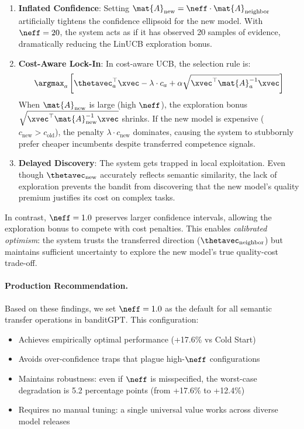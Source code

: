 \begin{enumerate}[leftmargin=*, itemsep=2pt]
    \item \textbf{Inflated Confidence}: Setting $\mat{A}_{\text{new}} = \neff \cdot \mat{A}_{\text{neighbor}}$ artificially tightens the confidence ellipsoid for the new model. With $\neff=20$, the system acts as if it has observed 20 samples of evidence, dramatically reducing the LinUCB exploration bonus.
    
    \item \textbf{Cost-Aware Lock-In}: In cost-aware UCB, the selection rule is:
    \[
    \argmax_{a} \left[ \thetavec_a^\top \xvec - \lambda \cdot c_a + \alpha \sqrt{\xvec^\top \mat{A}_a^{-1} \xvec} \right]
    \]
    When $\mat{A}_{\text{new}}$ is large (high $\neff$), the exploration bonus $\sqrt{\xvec^\top \mat{A}_{\text{new}}^{-1} \xvec}$ shrinks. If the new model is expensive ($c_{\text{new}} > c_{\text{old}}$), the penalty $\lambda \cdot c_{\text{new}}$ dominates, causing the system to stubbornly prefer cheaper incumbents despite transferred competence signals.
    
    \item \textbf{Delayed Discovery}: The system gets trapped in local exploitation. Even though $\thetavec_{\text{new}}$ accurately reflects semantic similarity, the lack of exploration prevents the bandit from discovering that the new model's quality premium justifies its cost on complex tasks.
\end{enumerate}

In contrast, $\neff=1.0$ preserves larger confidence intervals, allowing the exploration bonus to compete with cost penalties. This enables \textit{calibrated optimism}: the system trusts the transferred direction ($\thetavec_{\text{neighbor}}$) but maintains sufficient uncertainty to explore the new model's true quality-cost trade-off.

\paragraph{Production Recommendation.}
Based on these findings, we set $\neff=1.0$ as the default for all semantic transfer operations in banditGPT. This configuration:
\begin{itemize}[leftmargin=*, itemsep=2pt]
    \item Achieves empirically optimal performance (+17.6\% vs Cold Start)
    \item Avoids over-confidence traps that plague high-$\neff$ configurations
    \item Maintains robustness: even if $\neff$ is misspecified, the worst-case degradation is 5.2 percentage points (from +17.6\% to +12.4\%)
    \item Requires no manual tuning: a single universal value works across diverse model releases
\end{itemize}

